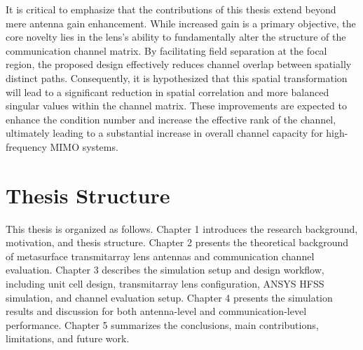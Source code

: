 It is critical to emphasize that the contributions of this thesis extend beyond mere antenna gain enhancement. While increased gain is a primary objective, the core novelty lies in the lens's ability to fundamentally alter the structure of the communication channel matrix. By facilitating field separation at the focal region, the proposed design effectively reduces channel overlap between spatially distinct paths. Consequently, it is hypothesized that this spatial transformation will lead to a significant reduction in spatial correlation and more balanced singular values within the channel matrix. These improvements are expected to enhance the condition number and increase the effective rank of the channel, ultimately leading to a substantial increase in overall channel capacity for high-frequency MIMO systems.


\section{Thesis Structure}
This thesis is organized as follows. Chapter 1 introduces the research background, motivation, and thesis structure. Chapter 2 presents the theoretical background of metasurface transmitarray lens antennas and communication channel evaluation. Chapter 3 describes the simulation setup and design workflow, including unit cell design, transmitarray lens configuration, ANSYS HFSS simulation, and channel evaluation setup. Chapter 4 presents the simulation results and discussion for both antenna-level and communication-level performance. Chapter 5 summarizes the conclusions, main contributions, limitations, and future work.
